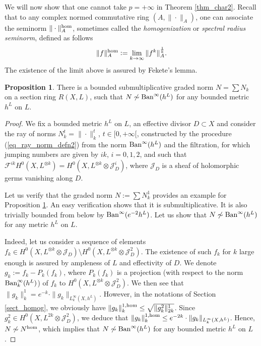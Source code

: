 \documentclass[12pt]{article}
\numberwithin{equation}{section}
\theoremstyle{theorem}
\theoremstyle{definition}
\newtheorem{prop}[thm]{Proposition}
\theoremstyle{remark}
\begin{document}
	\par
	We will now show that one cannot take $p = + \infty$ in Theorem \ref{thm_char2}.
	Recall that to any complex normed commutative ring $(A, \| \cdot \|_A)$, one can associate the seminorm $\| \cdot \|_A^{{\rm{hom}}}$, sometimes called the \textit{homogenization} or \textit{spectral radius seminorm}, defined as follows
	\begin{equation}\label{eq_homog_defn}
		\| f \|_A^{{\rm{hom}}}
		:=
		\lim_{k \to \infty} \| f^k \|_A^{\frac{1}{k}}.
	\end{equation}
	The existence of the limit above is assured by Fekete's lemma.
	
	\begin{prop}\label{prop_example}
		There is a bounded submultiplicative graded norm $N = \sum N_k$ on a section ring $R(X, L)$, such that $N \not\sim {\rm{Ban}}^{\infty}(h^L)$ for any bounded metric $h^L$ on $L$.
	\end{prop}
	\begin{proof}
		We fix a bounded metric $h^L$ on $L$, an effective divisor $D \subset X$ and consider the ray of norms $N_k^{t} = \| \cdot \|_k^{t}$, $t \in [0, +\infty[$, constructed by the procedure (\ref{eq_ray_norm_defn2}) from the norm ${\rm{Ban}}^{\infty}(h^L)$ and the filtration, for which jumping numbers are given by $ik$, $i = 0, 1, 2$, and such that $\mathcal{F}^{ik} H^0(X, L^{\otimes k}) = H^0(X, L^{\otimes k} \otimes \mathcal{J}_D^i)$, where $\mathcal{J}_D$ is a sheaf of holomorphic germs vanishing along $D$.
		\par 
		Let us verify that the graded norm $N := \sum N_k^{1}$ provides an example for Proposition \ref{prop_example}.
		An easy verification shows that it is submultiplicative.
		It is also trivially bounded from below by ${\rm{Ban}}^{\infty}(e^{-2}h^L)$.
		Let us show that $N \not\sim {\rm{Ban}}^{\infty}(h^L)$ for any metric $h^L$ on $L$.
		\par 
		Indeed, let us consider a sequence of elements $f_k \in H^0(X, L^{\otimes k} \otimes \mathcal{J}_D) \setminus H^0(X, L^{\otimes k} \otimes \mathcal{J}_D^2)$. 
		The existence of such $f_k$ for $k$ large enough is assured by ampleness of $L$ and effectivity of $D$.
		We denote $g_k := f_k - P_k(f_k)$, where $P_k(f_k)$ is a projection (with respect to the norm ${\rm{Ban}}^{\infty}_k(h^L)$) of $f_k$ to $H^0(X, L^{\otimes k} \otimes \mathcal{J}_D^2)$.
		We then see that $
			\| g_k \|_k^{1}
			=
			e^{- k} \cdot 
			\| g_k \|_{L^{\infty}_{k}(X, h^L)}
		$.
		However, in the notations of Section \ref{sect_homog}, we obviously have $\| g_k \|_k^{1, \rm{hom}}
			\leq
			\sqrt{
				\| g_k^2 \|^{1}_{2k}
			}$. 
		Since $g_k^2 \in H^0(X, L^{2k} \otimes \mathcal{J}_D^2)$, we deduce that
		$
			\| g_k \|_k^{1, \rm{hom}}
			\leq
			e^{- 2k} \cdot 
			\| g_k \|_{L^{\infty}_{k}(X, h^L)}
		$.
		Hence, $N \not\sim N^{{\rm{hom}}}$, which implies that $N \not\sim {\rm{Ban}}^{\infty}(h^L)$ for any bounded metric $h^L$ on $L$.
	\end{proof}
\end{document}

